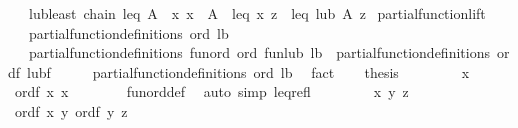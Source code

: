 \begin{isabellebody}
\ \ \ lub{\isacharunderscore}{\kern0pt}least{\isacharcolon}{\kern0pt}\ {\isachardoublequoteopen}chain\ leq\ A\ {\isasymLongrightarrow}\ {\isacharparenleft}{\kern0pt}{\isasymAnd}x{\isachardot}{\kern0pt}\ x\ {\isasymin}\ A\ {\isasymLongrightarrow}\ leq\ x\ z{\isacharparenright}{\kern0pt}\ {\isasymLongrightarrow}\ leq\ {\isacharparenleft}{\kern0pt}lub\ A{\isacharparenright}{\kern0pt}\ z{\isachardoublequoteclose}\isanewline
\isanewline
{}\isamarkupfalse%
\ partial{\isacharunderscore}{\kern0pt}function{\isacharunderscore}{\kern0pt}lift{\isacharcolon}{\kern0pt}\isanewline
\ \ \ {\isachardoublequoteopen}partial{\isacharunderscore}{\kern0pt}function{\isacharunderscore}{\kern0pt}definitions\ ord\ lb{\isachardoublequoteclose}\isanewline
\ \ \ {\isachardoublequoteopen}partial{\isacharunderscore}{\kern0pt}function{\isacharunderscore}{\kern0pt}definitions\ {\isacharparenleft}{\kern0pt}fun{\isacharunderscore}{\kern0pt}ord\ ord{\isacharparenright}{\kern0pt}\ {\isacharparenleft}{\kern0pt}fun{\isacharunderscore}{\kern0pt}lub\ lb{\isacharparenright}{\kern0pt}{\isachardoublequoteclose}\ {\isacharparenleft}{\kern0pt}\ {\isachardoublequoteopen}partial{\isacharunderscore}{\kern0pt}function{\isacharunderscore}{\kern0pt}definitions\ {\isacharquery}{\kern0pt}ordf\ {\isacharquery}{\kern0pt}lubf{\isachardoublequoteclose}{\isacharparenright}{\kern0pt}\isanewline
%
\isadelimproof
%
\endisadelimproof
%
\isatagproof
{}\isamarkupfalse%
\ {\isacharminus}{\kern0pt}\isanewline
\ \ \isamarkupfalse%
\ partial{\isacharunderscore}{\kern0pt}function{\isacharunderscore}{\kern0pt}definitions\ ord\ lb\ \isamarkupfalse%
\ fact\isanewline
\isanewline
\ \ \isamarkupfalse%
\ {\isacharquery}{\kern0pt}thesis\isanewline
\ \ \isamarkupfalse%
\isanewline
\ \ \ \ \isamarkupfalse%
\ x\ \isamarkupfalse%
\ {\isachardoublequoteopen}{\isacharquery}{\kern0pt}ordf\ x\ x{\isachardoublequoteclose}\isanewline
\ \ \ \ \ \ \isamarkupfalse%
\ fun{\isacharunderscore}{\kern0pt}ord{\isacharunderscore}{\kern0pt}def\ \isamarkupfalse%
\ {\isacharparenleft}{\kern0pt}auto\ simp{\isacharcolon}{\kern0pt}\ leq{\isacharunderscore}{\kern0pt}refl{\isacharparenright}{\kern0pt}\isanewline
\ \ \isamarkupfalse%
\isanewline
\ \ \ \ \isamarkupfalse%
\ x\ y\ z\ \isamarkupfalse%
\ {\isachardoublequoteopen}{\isacharquery}{\kern0pt}ordf\ x\ y{\isachardoublequoteclose}\ {\isachardoublequoteopen}{\isacharquery}{\kern0pt}ordf\ y\ z{\isachardoublequoteclose}\isanewline

\end{isabellebody}
